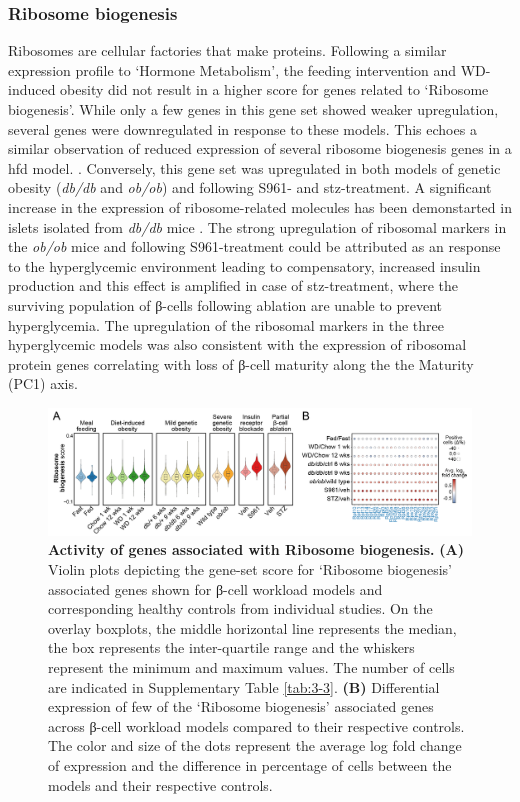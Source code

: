 \subsubsection{Ribosome biogenesis}
Ribosomes are cellular factories that make proteins. Following a similar expression profile to `Hormone Metabolism', the feeding intervention and WD-induced obesity did not result in a higher score for genes related to `Ribosome biogenesis'. While only a few genes in this gene set showed weaker upregulation, several genes were downregulated in response to these models. This echoes a similar observation of reduced expression of several ribosome biogenesis genes in a \gls{hfd} model. \textbf{\cite{https://www.nature.com/articles/s41598-017-03869-5}}. Conversely, this gene set was upregulated in both models of genetic obesity (\textit{db/db} and \textit{ob/ob}) and following S961- and \gls{stz}-treatment. A significant increase in the expression of ribosome-related molecules has been demonstarted in islets isolated from \textit{db/db} mice \textbf{\cite{https://pubmed.ncbi.nlm.nih.gov/19309774/}}. The strong upregulation of ribosomal markers in the \textit{ob/ob} mice and following S961-treatment could be attributed as an response to the hyperglycemic environment leading to compensatory, increased insulin production and this effect is amplified in case of \gls{stz}-treatment, where the surviving population of β-cells following ablation are unable to prevent hyperglycemia. The upregulation of the ribosomal markers in the three hyperglycemic models was also consistent with the expression of ribosomal protein genes correlating with loss of β-cell maturity along the the Maturity (PC1) axis.

\begin{figure}[H]
\centering
\includegraphics[width=\linewidth]{Chapter5/Fig/F3-13-03.png}
\caption[Gene-set scoring of `\textit{Ribosome biogenesis}']{\textbf{Activity of genes associated with Ribosome biogenesis.} \textbf{(A)} Violin plots depicting the gene-set score for `Ribosome biogenesis' associated genes shown for β-cell workload models and corresponding healthy controls from individual studies. On the overlay boxplots, the middle horizontal line represents the median, the box represents the inter-quartile range and the whiskers represent the minimum and maximum values. The number of cells are indicated in Supplementary Table \ref{tab:3-3}. \textbf{(B)} Differential expression of few of the `Ribosome biogenesis' associated genes across β-cell workload models compared to their respective controls. The color and size of the dots represent the average log fold change of expression and the difference in percentage of cells between the models and their respective controls.}
\label{fig:3-13-3}
\end{figure}


